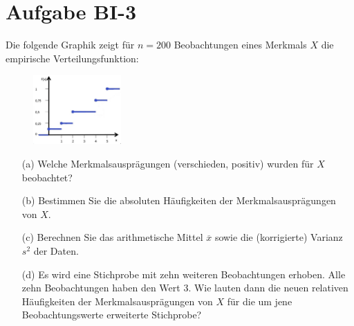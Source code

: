 
\section{Aufgabe BI-3}

\begin{task}
    Die folgende Graphik zeigt für $n=200$ Beobachtungen eines Merkmals $X$ die empirische Verteilungsfunktion:

    \begin{figure}[H]
        \begin{center}
            \includegraphics[width=0.3\textwidth]{assets/b03_task3.png}
        \end{center}
    \end{figure}

    \begin{enumerate}
        \item[(a)] Welche Merkmalsausprägungen (verschieden, positiv) wurden für $X$ beobachtet?
    \end{enumerate}
\end{task}

\begin{task}
    \begin{enumerate}
        \item[(b)] Bestimmen Sie die absoluten Häufigkeiten der Merkmalsausprägungen von $X$.
    \end{enumerate}
\end{task}

\begin{task}
    \begin{enumerate}
        \item[(c)] Berechnen Sie das arithmetische Mittel $\overline{x}$ sowie die (korrigierte) Varianz $s^2$ der Daten.
    \end{enumerate}
\end{task}

\begin{task}
    \begin{enumerate}
        \item[(d)] Es wird eine Stichprobe mit zehn weiteren Beobachtungen erhoben. Alle zehn Beobachtungen haben den Wert $3$. Wie lauten dann die neuen relativen Häufigkeiten der Merkmalsausprägungen von $X$ für die um jene Beobachtungswerte erweiterte Stichprobe?
    \end{enumerate}
\end{task}
